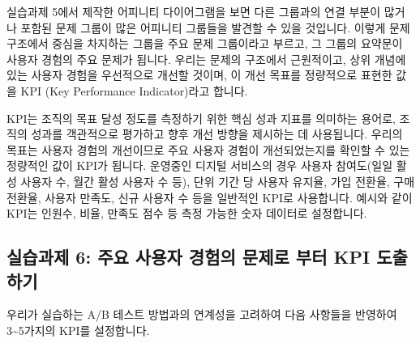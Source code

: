 \documentclass[
  letterpaper,
]{book}
\begin{document}
실습과제 5에서 제작한 어피니티 다이어그램을 보면 다른 그룹과의 연결
부분이 많거나 포함된 문제 그룹이 많은 어피니티 그룹들을 발견할 수 있을
것입니다. 이렇게 문제 구조에서 중심을 차지하는 그룹을 주요 문제
그룹이라고 부르고, 그 그룹의 요약문이 사용자 경험의 주요 문제가 됩니다.
우리는 문제의 구조에서 근원적이고, 상위 개념에 있는 사용자 경험을
우선적으로 개선할 것이며, 이 개선 목표를 정량적으로 표현한 값을 KPI (Key
Performance Indicator)라고 합니다.

KPI는 조직의 목표 달성 정도를 측정하기 위한 핵심 성과 지표를 의미하는
용어로, 조직의 성과를 객관적으로 평가하고 향후 개선 방향을 제시하는 데
사용됩니다. 우리의 목표는 사용자 경험의 개선이므로 주요 사용자 경험이
개선되었는지를 확인할 수 있는 정량적인 값이 KPI가 됩니다. 운영중인
디지털 서비스의 경우 사용자 참여도(일일 활성 사용자 수, 월간 활성 사용자
수 등), 단위 기간 당 사용자 유지율, 가입 전환율, 구매 전환율, 사용자
만족도, 신규 사용자 수 등을 일반적인 KPI로 사용합니다. 예시와 같이 KPI는
인원수, 비율, 만족도 점수 등 측정 가능한 숫자 데이터로 설정합니다.

\subsection{실습과제 6: 주요 사용자 경험의 문제로 부터 KPI
도출하기}\label{uxc2e4uxc2b5uxacfcuxc81c-6-uxc8fcuxc694-uxc0acuxc6a9uxc790-uxacbduxd5d8uxc758-uxbb38uxc81cuxb85c-uxbd80uxd130-kpi-uxb3c4uxcd9cuxd558uxae30}

우리가 실습하는 A/B 테스트 방법과의 연계성을 고려하여 다음 사항들을
반영하여 3\textasciitilde5가지의 KPI를 설정합니다.
\end{document}
